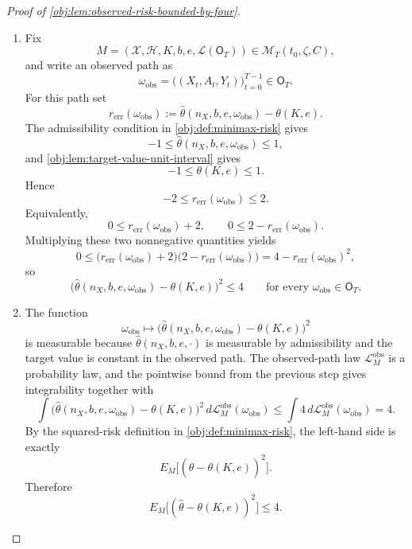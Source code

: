 \begin{proof}[Proof of \cref{obj:lem:observed-risk-bounded-by-four}]
\begin{enumerate}
\item Fix
\[
M=(\mathcal X,\mathcal H,K,b,e,\mathcal L(\mathsf O_T))\in
\mathcal M_T(t_0,\zeta,C),
\]
and write an observed path as
\[
\omega_{\mathrm{obs}}=\bigl((X_t,A_t,Y_t)\bigr)_{t=0}^{T-1}\in \mathsf O_T .
\]
For this path set
\[
r_{\mathrm{err}}(\omega_{\mathrm{obs}})
:=
\widehat\theta(n_X,b,e,\omega_{\mathrm{obs}})-\theta(K,e).
\]
The admissibility condition in \cref{obj:def:minimax-risk} gives
\[
-1\le \widehat\theta(n_X,b,e,\omega_{\mathrm{obs}})\le 1,
\]
and \cref{obj:lem:target-value-unit-interval} gives
\[
-1\le \theta(K,e)\le 1 .
\]
Hence
\[
-2\le r_{\mathrm{err}}(\omega_{\mathrm{obs}})\le 2 .
\]
Equivalently,
\[
0\le r_{\mathrm{err}}(\omega_{\mathrm{obs}})+2,
\qquad
0\le 2-r_{\mathrm{err}}(\omega_{\mathrm{obs}}).
\]
Multiplying these two nonnegative quantities yields
\[
0\le
\bigl(r_{\mathrm{err}}(\omega_{\mathrm{obs}})+2\bigr)
\bigl(2-r_{\mathrm{err}}(\omega_{\mathrm{obs}})\bigr)
=
4-r_{\mathrm{err}}(\omega_{\mathrm{obs}})^2,
\]
so
\[
\bigl(\widehat\theta(n_X,b,e,\omega_{\mathrm{obs}})-\theta(K,e)\bigr)^2
\le 4
\qquad
\text{for every }\omega_{\mathrm{obs}}\in\mathsf O_T .
\] %

\item The function
\[
\omega_{\mathrm{obs}}
\longmapsto
\bigl(\widehat\theta(n_X,b,e,\omega_{\mathrm{obs}})-\theta(K,e)\bigr)^2
\]
is measurable because \(\widehat\theta(n_X,b,e,\cdot)\) is measurable by admissibility and the target value is constant in the observed path. The observed-path law \(\mathcal L_M^{\mathrm{obs}}\) is a probability law, and the pointwise bound from the previous step gives integrability together with
\[
\int
\bigl(\widehat\theta(n_X,b,e,\omega_{\mathrm{obs}})-\theta(K,e)\bigr)^2
\,d\mathcal L_M^{\mathrm{obs}}(\omega_{\mathrm{obs}})
\le
\int 4\,d\mathcal L_M^{\mathrm{obs}}(\omega_{\mathrm{obs}})
=
4 .
\]
By the squared-risk definition in \cref{obj:def:minimax-risk}, the left-hand side is exactly
\[
E_M\bigl[(\widehat\theta-\theta(K,e))^2\bigr].
\]
Therefore
\[
E_M\bigl[(\widehat\theta-\theta(K,e))^2\bigr]\le 4 .
\] %
\end{enumerate}
\end{proof}
